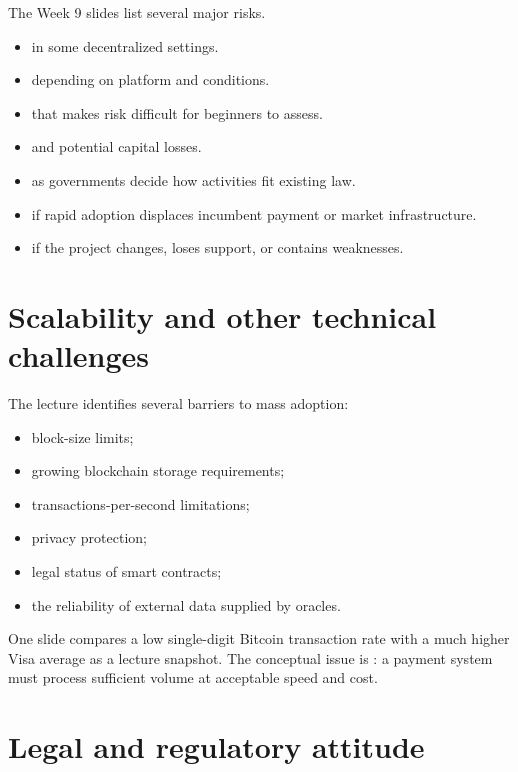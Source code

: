 The Week 9 slides list several major risks.

\begin{itemize}
  \item {} in some decentralized settings.
  \item {} depending on platform and conditions.
  \item {} that makes risk difficult for beginners to assess.
  \item {} and potential capital losses.
  \item {} as governments decide how activities fit existing law.
  \item {} if rapid adoption displaces incumbent payment or market infrastructure.
  \item {} if the project changes, loses support, or contains weaknesses.
\end{itemize}

\section{Scalability and other technical challenges}

The lecture identifies several barriers to mass adoption:

\begin{itemize}
  \item block-size limits;
  \item growing blockchain storage requirements;
  \item transactions-per-second limitations;
  \item privacy protection;
  \item legal status of smart contracts;
  \item the reliability of external data supplied by oracles.
\end{itemize}

One slide compares a low single-digit Bitcoin transaction rate with a much higher Visa average as a lecture snapshot. The conceptual issue is : a payment system must process sufficient volume at acceptable speed and cost.

\section{Legal and regulatory attitude}


